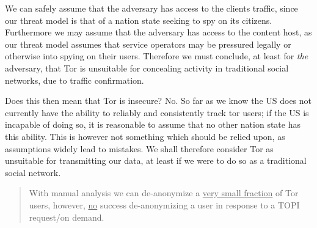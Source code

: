 We can safely assume that the adversary has access to the clients traffic, since
our threat model is that of a nation state seeking to spy on its citizens.
Furthermore we may assume that the adversary has access to the content host, as
our threat model assumes that service operators may be pressured legally or
otherwise into spying on their users. Therefore we must conclude, at least for
\textit{the} adversary, that Tor is unsuitable for concealing activity in
traditional social networks, due to traffic confirmation.

Does this then mean that Tor is insecure? No. So far as we know\cite{torStinks}
the US does not currently have the ability to reliably and consistently track
tor users; if the US is incapable of doing so, it is reasonable to assume that
no other nation state has this ability. This is however not something which
should be relied upon, as assumptions widely lead to mistakes. We shall 
therefore consider Tor as unsuitable for transmitting our data, at least if we 
were to do so as a traditional social network.

\begin{quote}
With manual analysis we can de-anonymize a \uline{very small fraction} of Tor
users, however, \uline{no} success de-anonymizing a user in response to a TOPI
request/on demand\cite{torStinks}.
\end{quote}
